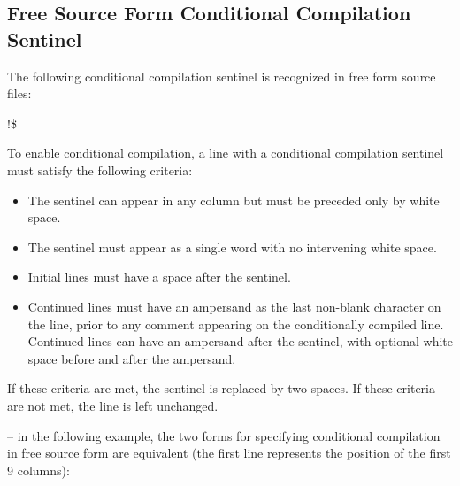 \subsection{Free Source Form Conditional Compilation Sentinel}
\label{subsec:Free Source Form Conditional Compilation Sentinel}
The following conditional compilation sentinel is recognized in free form source files:

\begin{boxedcode}
!\$
\end{boxedcode}

To enable conditional compilation, a line with a conditional compilation sentinel must 
satisfy the following criteria: 

\begin{itemize}
\item The sentinel can appear in any column but must be preceded only by white space.

\item The sentinel must appear as a single word with no intervening white space. 

\item Initial lines must have a space after the sentinel. 

\item Continued lines must have an ampersand as the last non-blank character on the line, 
prior to any comment appearing on the conditionally compiled line. Continued lines 
can have an ampersand after the sentinel, with optional white space before and after 
the ampersand. 
\end{itemize}

If these criteria are met, the sentinel is replaced by two spaces. If these criteria are not 
met, the line is left unchanged. 

\notestart
\noteheader – in the following example, the two forms for specifying conditional compilation 
in free source form are equivalent (the first line represents the position of the first 9 
columns):

\begin{alltt}
\end{alltt}
\noteend
\bigskip
\fortranspecificend









